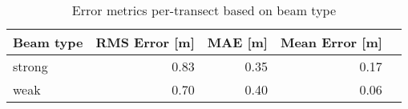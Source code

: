 \begin{table}[htbp]
\centering
\caption{Error metrics per-transect based on beam type}
\label{tab:error-by-strongweak}
\begin{tabular}{lrrrr}
\toprule
Beam type & RMS Error [m] & MAE [m] & Mean Error [m] \\
\midrule
strong & 0.83 & 0.35 & 0.17 \\
weak & 0.70 & 0.40 & 0.06  \\
\bottomrule
\end{tabular}
\end{table}
